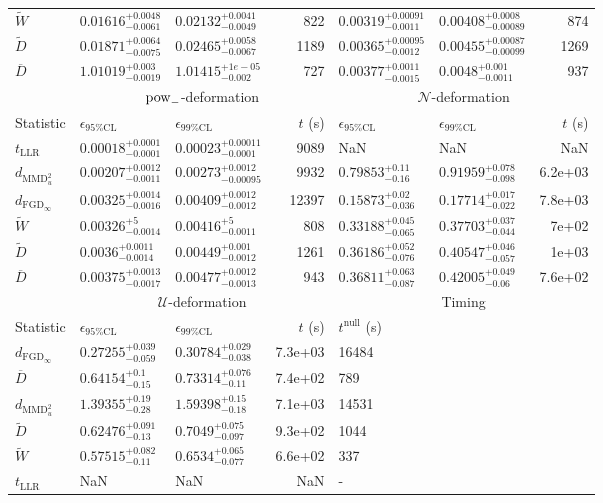 \begin{tabular}{l|llr|llr}
	$\widetilde{W}$ & $0.01616_{-0.0061}^{+0.0048}$ & $0.02132_{-0.0049}^{+0.0041}$ & 822 & $0.00319_{-0.0011}^{+0.00091}$ & $0.00408_{-0.00089}^{+0.0008}$ & 874 \\
	$\widetilde{D}$ & $0.01871_{-0.0075}^{+0.0064}$ & $0.02465_{-0.0067}^{+0.0058}$ & 1189 & $0.00365_{-0.0012}^{+0.00095}$ & $0.00455_{-0.00099}^{+0.00087}$ & 1269 \\
	$\overline{D}$ & $1.01019_{-0.0019}^{+0.003}$ & $1.01415_{-0.002}^{+1e-05}$ & 727 & $0.00377_{-0.0015}^{+0.0011}$ & $0.0048_{-0.0011}^{+0.001}$ & 937 \\
	\toprule
	\multicolumn{1}{c}{} & \multicolumn{3}{c}{$\rm{pow}_{-}$-deformation} & \multicolumn{3}{c}{$\mathcal{N}$-deformation} \\
	Statistic & $\epsilon_{95\%\mathrm{CL}}$ & $\epsilon_{99\%\mathrm{CL}}$ & $t$ (s) & $\epsilon_{95\%\mathrm{CL}}$ & $\epsilon_{99\%\mathrm{CL}}$ & $t$ (s) \\
	\midrule
	$t_{\mathrm{LLR}}$ & $0.00018_{-0.0001}^{+0.0001}$ & $0.00023_{-0.0001}^{+0.00011}$ & 9089 & NaN & NaN & NaN \\
	$d_{\mathrm{MMD}^{2}_{u}}$ & $0.00207_{-0.0011}^{+0.0012}$ & $0.00273_{-0.00095}^{+0.0012}$ & 9932 & $0.79853_{-0.16}^{+0.11}$ & $0.91959_{-0.098}^{+0.078}$ & 6.2e+03 \\
	$d_{\mathrm{FGD}_{\infty}}$ & $0.00325_{-0.0016}^{+0.0014}$ & $0.00409_{-0.0012}^{+0.0012}$ & 12397 & $0.15873_{-0.036}^{+0.02}$ & $0.17714_{-0.022}^{+0.017}$ & 7.8e+03 \\
	$\widetilde{W}$ & $0.00326_{-0.0014}^{+5}$ & $0.00416_{-0.0011}^{+5}$ & 808 & $0.33188_{-0.065}^{+0.045}$ & $0.37703_{-0.044}^{+0.037}$ & 7e+02 \\
	$\widetilde{D}$ & $0.0036_{-0.0014}^{+0.0011}$ & $0.00449_{-0.0012}^{+0.001}$ & 1261 & $0.36186_{-0.076}^{+0.052}$ & $0.40547_{-0.057}^{+0.046}$ & 1e+03 \\
	$\overline{D}$ & $0.00375_{-0.0017}^{+0.0013}$ & $0.00477_{-0.0013}^{+0.0012}$ & 943 & $0.36811_{-0.087}^{+0.063}$ & $0.42005_{-0.06}^{+0.049}$ & 7.6e+02 \\
	\toprule
	\multicolumn{1}{c}{} & \multicolumn{3}{c}{$\mathcal{U}$-deformation} & \multicolumn{3}{c}{Timing} \\
	Statistic & $\epsilon_{95\%\mathrm{CL}}$ & $\epsilon_{99\%\mathrm{CL}}$ & $t$ (s) & $t^{\mathrm{null}}$ (s) \\
	\midrule
	$d_{\mathrm{FGD}_{\infty}}$ & $0.27255_{-0.059}^{+0.039}$ & $0.30784_{-0.038}^{+0.029}$ & 7.3e+03 & 16484 \\
	$\overline{D}$ & $0.64154_{-0.15}^{+0.1}$ & $0.73314_{-0.11}^{+0.076}$ & 7.4e+02 & 789 \\
	$d_{\mathrm{MMD}^{2}_{u}}$ & $1.39355_{-0.28}^{+0.19}$ & $1.59398_{-0.18}^{+0.15}$ & 7.1e+03 & 14531 \\
	$\widetilde{D}$ & $0.62476_{-0.13}^{+0.091}$ & $0.7049_{-0.097}^{+0.075}$ & 9.3e+02 & 1044 \\
	$\widetilde{W}$ & $0.57515_{-0.11}^{+0.082}$ & $0.6534_{-0.077}^{+0.065}$ & 6.6e+02 & 337 \\
	$t_{\mathrm{LLR}}$ & NaN & NaN & NaN & - \\
	\bottomrule
\end{tabular}